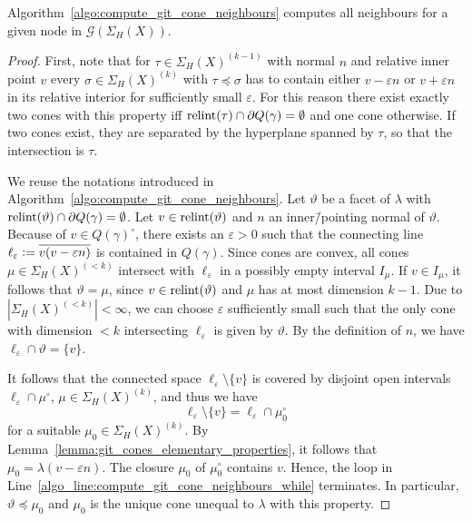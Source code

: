 \begin{prop}
	Algorithm~\ref{algo:compute_git_cone_neighbours} computes all neighbours for a given node in $\mathcal{G}(\Sigma_H(X))$.
\end{prop}

\begin{proof}
	First, note that for $\tau\in\Sigma_H(X)^{(k-1)}$ with normal $n$ and relative inner point $v$ every $\sigma\in\Sigma_H(X)^{(k)}$ with $\tau\preceq\sigma$ has to contain either $v-\varepsilon n$ or $v+\varepsilon n$ in its relative interior for sufficiently small $\varepsilon$. For this reason there exist exactly two cones with this property iff $\text{relint}(\tau)\cap\partial Q(\gamma) = \emptyset$ and one cone otherwise. If two cones exist, they are separated by the hyperplane spanned by $\tau$, so that the intersection is $\tau$.
	
	We reuse the notations introduced in Algorithm~\ref{algo:compute_git_cone_neighbours}. Let $\vartheta$ be a facet of $\lambda$ with $\text{relint}(\vartheta)\cap\partial Q(\gamma) = \emptyset$.
	Let $v\in\text{relint}(\vartheta)$ and $n$ an inner\=/pointing normal of $\vartheta$. Because of $v\in Q(\gamma)^\circ$, there exists an $\varepsilon > 0$ such that the connecting line $\ell_\varepsilon \mathrel{\mathop:}= \overline{v(v-\varepsilon n)}$ is contained in $Q(\gamma)$. Since cones are convex, all cones $\mu\in\Sigma_H(X)^{(<k)}$ intersect with $\ell_\varepsilon$ in a possibly empty interval $I_\mu$. If $v\in I_\mu$, it follows that $\vartheta = \mu$, since $v\in\text{relint}(\vartheta)$ and $\mu$ has at most dimension $k-1$. Due to $|\Sigma_H(X)^{(<k)}| < \infty$, we can choose $\varepsilon$ sufficiently small such that the only cone with dimension $<k$ intersecting $\ell_\varepsilon$ is given by $\vartheta$. By the definition of $n$, we have $\ell_\varepsilon \cap \vartheta = \{v\}$.
	
	It follows that the connected space $\ell_\varepsilon \setminus \{v\}$ is covered by disjoint open intervals $\ell_\varepsilon \cap \mu^\circ$, $\mu\in\Sigma_H(X)^{(k)}$, and thus we have $$\ell_\varepsilon \setminus \{v\} = \ell_\varepsilon \cap \mu_0^\circ$$
	for a suitable $\mu_0\in\Sigma_H(X)^{(k)}$. By Lemma~\ref{lemma:git_cones_elementary_properties}, it follows that $\mu_0 = \lambda(v-\varepsilon n)$. The closure $\mu_0$ of $\mu_0^\circ$ contains $v$. Hence, the loop in Line~\ref{algo_line:compute_git_cone_neighbours_while} terminates. In particular, $\vartheta\preceq\mu_0$ and $\mu_0$ is the unique cone unequal to $\lambda$ with this property.
\end{proof}

